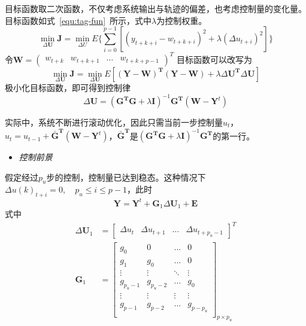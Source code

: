 目标函数取二次函数，不仅考虑系统输出与轨迹的偏差，也考虑控制量的变化量。目标函数如式~\ref{equ:tag-fun}~所示，式中$\lambda$为控制权重。
\begin{equation}
\label{equ:tag-fun}
\min_{\Delta{\bm{U}}}{\bm{J}} = \min_{\Delta{U}}E\{\sum_{i=0}^{p-1}{[(y_{t+k+i}-w_{t+k+i})^{2}+\lambda(\Delta{u_{t+i}})^{2}]}\}
\end{equation}
令$\bm{W} = {\begin{pmatrix} w_{t+k} & w_{t+k+1} &\ldots & w_{t+k+p-1} \end{pmatrix}}^{T}$
目标函数可以改写为
\begin{equation}
\min_{\Delta{\bm{U}}}{\bm{J}} = \min_{\Delta{\bm{U}}}E[(\bm{Y}-\bm{W})^{\bm{T}}(\bm{Y}-\bm{W})+\lambda\Delta{\bm{U}}^{\bm{T}}\Delta{\bm{U}}]
\end{equation}
极小化目标函数，即可得到控制律
\begin{equation}
\Delta{\bm{U}} = (\bm{G}^{\bm{T}}\bm{G}+\lambda{\bm{I}})^{-1}\bm{G}^{\bm{T}}(\bm{W}-\bm{Y}^{t})
\end{equation}

实际中，系统不断进行滚动优化，因此只需当前一步控制量$u_t$，$u_{t}=u_{t-1}+\bar{\bm{G}}^{\bm{T}}(\bm{W}-\bm{Y}^{t})$，$\bar{\bm{G}}^{\bm{T}}$是$(\bm{G}^{\bm{T}}\bm{G}+\lambda{\bm{I}})^{-1}\bm{G}^{\bm{T}}$的第一行。

\begin{itemize}
\item{\emph{控制前景}}
\end{itemize}

假定经过$p_{u}$步的控制，控制量已达到稳态。这种情况下$\Delta{u}(k)_{t+i} = 0, \quad p_{u} \leq i \leq p-1$，此时
\begin{equation}
\bm{Y}=\bm{Y}^{t}+\bm{G}_{1}\Delta{\bm{U}}_{1}+\bm{E}
\end{equation}
式中
\begin{align*}
{\Delta}{\bm{U}_{1}} &= \left[\begin{array}{cccc} {\Delta}{u_{t}} & \Delta{u_{t+1}} & \ldots & \Delta{u_{t+p_{u}-1}} \end{array}\right]^{T} \\
\bm{G}_{1} &= \left[{\begin{array}{cccc}
g_{0} & 0 & \ldots & 0 \\
g_{1} & g_{0} & \ldots & 0\\
\vdots & \vdots & \ddots & \vdots\\
g_{p_{u}-1} & g_{p_{u}-2} &\ldots & g_{0}\\
\vdots & \vdots & \vdots & \vdots\\
g_{p-1} & g_{p-2} &\ldots & g_{p-p_{u}}\\
\end{array}}\right]_{{p}\times{p_{u}}}
\end{align*}


